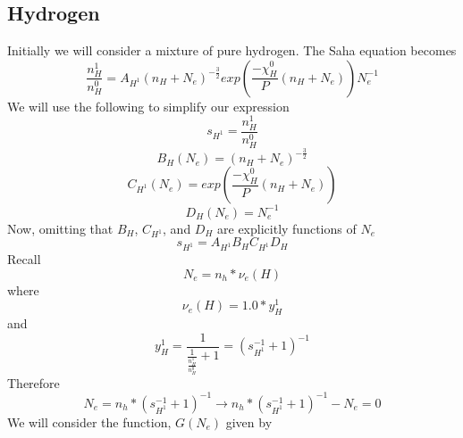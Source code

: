 \documentclass{article}
\begin{document}
		\subsection{Hydrogen}
			Initially we will consider a mixture of pure hydrogen. The Saha equation becomes
			\begin{equation} \label{eq:saha_pressure_revised_hydrogen}
				\frac{n^1_H}{n^0_H} = A_{H^{1}} \left( n_H + N_e \right)^{-\frac{3}{2}}
					exp\left(\frac{-\chi^0_H}{P} \left(n_H + N_e \right)\right) N_e^{-1}
			\end{equation}
			We will use the following to simplify our expression
			\begin{equation} \label{eq:saha_pressure_s_H1}
				s_{H^1} = \frac{n^1_H}{n^0_H}
			\end{equation}
			\begin{equation} \label{eq:saha_pressure_B_H_Ne}
				B_H(N_e) = (n_H + N_e)^{-\frac{3}{2}}
			\end{equation}
			\begin{equation} \label{eq:saha_pressure_C_H1_Ne}
				C_{H^1}(N_e) = exp\left(\frac{-\chi^0_H}{P} \left(n_H + N_e \right)\right) 
			\end{equation}
			\begin{equation} \label{eq:saha_pressure_D_H_Ne}
				D_H(N_e) = N_e^{-1}
			\end{equation}
			Now, omitting that $B_H$, $C_{H^1}$, and $D_H$ are explicitly functions of $N_e$
			\begin{equation} \label{eq:saha_pressure_constants_hydrogen}
				s_{H^1} = A_{H^{1}} B_H C_{H^1} D_H
			\end{equation}
			Recall
			\begin{equation} \label{eq:N_e_hydrogen}
				N_{e} = n_h * \nu_e(H)
			\end{equation}
			where
			\begin{equation} \label{eq:v_e_hydrogen}
				\nu_e(H) = 1.0 * y_H^1
			\end{equation}
			and 
			\begin{equation} \label{eq:ratio_H^1} 
				y_H^1 = \frac{1}{\frac{1}{\frac{n_H^1}{n_H^0}}+1} = 
						\left( s_{H^1}^{-1} + 1 \right)^{-1}
			\end{equation}
			Therefore
			\begin{equation} \label{eq:N_e_ratio_H^1_hydrogen}
				N_{e} = n_h * \left( s_{H^1}^{-1} + 1 \right)^{-1} \rightarrow
				n_h * \left( s_{H^1}^{-1} + 1 \right)^{-1} - N_e = 0
			\end{equation}
			We will consider the function, $G(N_e)$ given by
\end{document}
